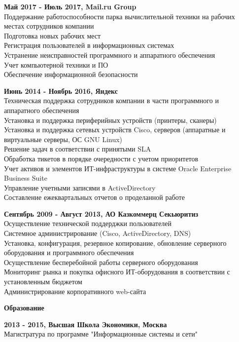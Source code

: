 \documentclass[a4paper,12pt,final]{memoir}
\newcommand{\Sep}{\vspace{1.5em}}
\newcommand{\SmallSep}{\vspace{0.5em}}
\newcommand{\CVSection}[1]
	{\Large\textbf{#1}\par
	\SmallSep\normalsize\normalfont}
\newcommand{\CVItem}[1]
	{\textbf{\color{RoyalBlue} #1}}
\begin{document}
\CVItem{Май 2017 - Июль 2017, Mail.ru Group}\\
Поддержание работоспособности парка вычислительной техники на рабочих местах сотрудников компании\\
Подготовка новых рабочих мест\\
Регистрация пользователей в информационных системах\\
Устранение неисправностей программного и аппаратного обеспечения\\
Учет компьютерной техники и ПО\\
Обеспечение информационной безопасности
\SmallSep

\CVItem{Июнь 2014 - Ноябрь 2016, Яндекс}\\
Техническая поддержка сотрудников компании в части программного и аппаратного обеспечения\\
Установка и поддержка периферийных устройств (принтеры, сканеры)\\
Установка и поддержка сетевых устройств Cisco, серверов (аппаратные и виртуальные серверы, ОС GNU Linux)\\
Решение задач в соответствии с принятыми SLA\\
Обработка тикетов в порядке очередности с учетом приоритетов\\
Учет активов и элементов ИТ-инфраструктуры в системе Oracle Enterprise Business Suite\\
Управление учетными записями в ActiveDirectory\\
Составление ежеквартальных отчетов о проделанной работе
\SmallSep

\CVItem{Сентябрь 2009 - Август 2013, АО Казкоммерц Секьюритиз}\\
Осуществление технической поддерджки пользователей\\
Системное администрирование (Cisco, ActiveDirectory, DNS)\\
Установка, конфигурация, резервное копирование, обновление серверного оборудования и программного обеспечения\\
Осуществление бесперебойной работы серверного оборудования\\
Мониторинг рынка и покупка офисного ИТ-оборудования в соответствии с установленным бюджетом\\
Администрирование корпоративного web-сайта

\Sep

\clearpage
\framebreak
\framebreak

\CVSection{Образование}
\CVItem{2013 - 2015, Высшая Школа Экономики, Москва}\\
Магистратура по программе "Информационные системы и сети"
\SmallSep
\end{document}
